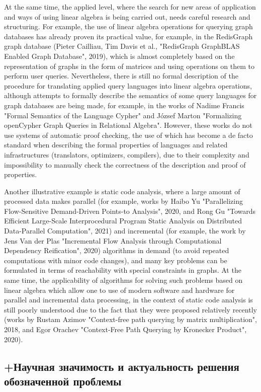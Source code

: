 \documentclass[12pt]{article}  %
\theoremstyle{remark}
\begin{document}
At the same time, the applied level, where the search for new areas of application and ways of using linear algebra is being carried out, needs careful research and structuring. For example, the use of linear algebra operations for querying graph databases has already proven its practical value, for example, in the RedisGraph graph database (Pieter Cailliau, Tim Davis et al., "RedisGraph GraphBLAS Enabled Graph Database", 2019), which is almost completely based on the representation of graphs in the form of matrices and using operations on them to perform user queries. Nevertheless, there is still no formal description of the procedure for translating applied query languages into linear algebra operations, although attempts to formally describe the semantics of some query languages for graph databases are being made, for example, in the works of Nadime Francis "Formal Semantics of the Language Cypher" and J\'{o}zsef Marton "Formalizing openCypher Graph Queries in Relational Algebra". However, these works do not use systems of automatic proof checking, the use of which has become a de facto standard when describing the formal properties of languages and related infrastructures (translators, optimizers, compilers), due to their complexity and impossibility to manually check the correctness of the description and proof of properties.

Another illustrative example is static code analysis, where a large amount of processed data makes parallel (for example, works by Haibo Yu "Parallelizing Flow-Sensitive Demand-Driven Points-to Analysis", 2020, and Rong Gu "Towards Efficient Large-Scale Interprocedural Program Static Analysis on Distributed Data-Parallel Computation", 2021) and incremental (for example, the work by Jens Van der Plas "Incremental Flow Analysis through Computational Dependency Reification", 2020) algorithms in demand (to avoid repeated computations with minor code changes), and many key problems can be formulated in terms of reachability with special constraints in graphs. At the same time, the applicability of algorithms for solving such problems based on linear algebra which allow one to use of modern software and hardware for parallel and incremental data processing, in the context of static code analysis is still poorly understood due to the fact that they were proposed relatively recently (works by Rustam Azimov "Context-free path querying by matrix multiplication", 2018, and Egor Orachev "Context-Free Path Querying by Kronecker Product", 2020).


\subsection{+Научная значимость и актуальность решения обозначенной проблемы}
\end{document}
